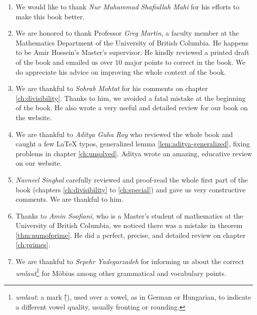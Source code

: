 \documentclass[leqno,14pt,DIV=calc,toc=index]{scrbook}
\begin{document}
\begin{enumerate}
		\item We would like to thank \textit{Nur Muhammad Shafiullah Mahi} for his efforts to make this book better.

		\item We are honored to thank Professor \textit{Greg Martin}, a faculty member at the Mathematics Department of the University of British Columbia. He happens to be Amir Hossein's Master's supervisor. He kindly reviewed a printed draft of the book and emailed us over $10$ major points to correct in the book. We do appreciate his advice on improving the whole context of the book.

		\item We are thankful to \textit{Sohrab Mohtat} for his comments on chapter \ref{ch:divisibility}. Thanks to him, we avoided a fatal mistake at the beginning of the book. He also wrote a very useful and detailed review for our book on the website.

		\item We are thankful to \textit{Aditya Guha Roy} who reviewed the whole book and caught a few LaTeX typos, generalized lemma \eqref{lem:aditya-generalized}, fixing problems in chapter \ref{ch:unsolved}. Aditya wrote an amazing, educative review on our website.
		\item \textit{Navneel Singhal} carefully reviewed and proof-read the whole first part of the book (chapters \ref{ch:divisibility} to \ref{ch:special}) and gave us very constructive comments. We are thankful to him.

		\item Thanks to \textit{Amin Soofiani}, who is a Master's student of mathematics at the University of British Columbia, we noticed there was a mistake in theorem \eqref{thm:numofprime}. He did a perfect, precise, and detailed review on chapter \ref{ch:primes}.

		\item We are thankful to \textit{Sepehr Yadegarzadeh} for informing us about the correct \textit{umlaut}\footnote{\textit{umlaut}: a mark (\H{}), used over a vowel, as in German or Hungarian, to indicate a different vowel quality, usually fronting or rounding.} for M\"{o}bius among other grammatical and vocabulary points.
	\end{enumerate}
	
	\printnomenclature
	\tableofcontents
	\mainmatter
	\pagestyle{headings}
	
	
	
	
	
	
	
	\backmatter
	\pagestyle{empty}
	\printglossaries
	\printbibliography[heading=bibintoc]
	\printindex
\end{document}
